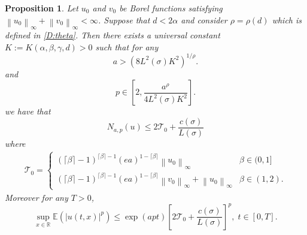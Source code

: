 \documentclass[a4paper,11pt]{article}
\numberwithin{equation}{section}
\theoremstyle{plain}
\newtheorem{proposition}[theorem]{Proposition}
\theoremstyle{definition}
\newcommand{\Norm}[1]{\left\|  #1   \right\|}
\newcommand{\R}{\mathbb{R}}
\numberwithin{NQ}{section}
\numberwithin{LQ}{section}
\numberwithin{ZQ}{section}
\begin{document}
	\begin{proposition}{\normalfont\cite[Proposition 3.2]{SoleMillet2021}}
		\label{P:N(u)Bdd}
		Let $u_0$ and $v_0$ be Borel functions satisfying $\Norm{u_0}_\infty + \Norm{v_0}_\infty < \infty$. Suppose that $d < 2 \alpha$ and consider $\rho = \rho(d)$ which is defined in \eqref{D:theta}. Then there exists a universal constant $K:=K(\alpha, \beta, \gamma,d) >0$ such that for any 
		\[
		a > \left( 8 L^2(\sigma)K^2\right)^{1/\rho}.
		\]
		and 
		\[
		p \in \left[ 2, \frac{a^{\rho}}{4L^2(\sigma)K^2} \right].
		\]
		we have that 
		\begin{equation}
		\label{E:Nbdd}
		N_{a,p}(u)  \le 2 \mathcal{T}_0 +  \frac{c(\sigma)}{L(\sigma)}
		\end{equation}	
		where
		\begin{align*}
		\mathcal{T}_0 = \begin{cases} 
		(\lceil \beta \rceil - 1)^{\lceil \beta \rceil -1}(ea)^{1-\lceil \beta \rceil} \Norm{u_0}_\infty  & \beta \in (0,1]
		\\ (\lceil \beta \rceil - 1)^{\lceil \beta \rceil -1}(ea)^{1-\lceil \beta \rceil} \Norm{v_0}_\infty + \Norm{u_0}_\infty & \beta \in (1,2).
		\end{cases} 
		\end{align*}
		Moreover for any $T>0$,
		\begin{equation}
		\label{E:Pnormtbdd}
		\sup_{x\in\R} \mathbb{E}(|u(t,x)|^p) \le \exp\left( a p t  \right) \left[ 2 \mathcal{T}_0 + \frac{ c(\sigma) }{L(\sigma)} \right]^p, \; t\in[0,T].
		\end{equation}
	\end{proposition}
\end{document}
